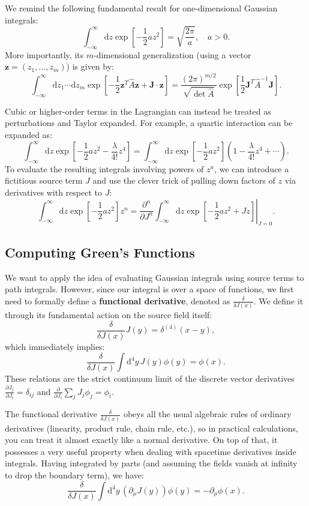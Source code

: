 We remind the following fundamental result for one-dimensional Gaussian integrals:
\[
    \int_{-\infty}^{\infty} \mathrm{d} z \exp\left[-\frac{1}{2} a z^2\right] = \sqrt{\frac{2\pi}{a}}, \quad a > 0.
\]
More importantly, its $m$-dimensional generalization (using a vector $\mathbf{z} = (z_1, \ldots, z_m)$) is given by:
\[
    \int_{-\infty}^{\infty} \mathrm{d} z_1 \cdots \mathrm{d} z_m \exp\left[-\frac{1}{2} \mathbf{z}^T \hat{A} \mathbf{z} + \mathbf{J} \cdot \mathbf{z}\right] = \frac{(2\pi)^{m/2}}{\sqrt{\det \hat{A}}} \exp\left[\frac{1}{2} \mathbf{J}^T \hat{A}^{-1} \mathbf{J}\right].
\]

Cubic or higher-order terms in the Lagrangian can instead be treated as perturbations and Taylor expanded. For example, a quartic interaction can be expanded as:
\[
    \int_{-\infty}^{\infty} \mathrm{d}z \exp\left[-\frac{1}{2} a z^2 - \frac{\lambda}{4!} z^4\right] = \int_{-\infty}^{\infty} \mathrm{d}z \exp\left[-\frac{1}{2} a z^2\right] \left( 1 - \frac{\lambda}{4!} z^4 + \cdots \right).
\]
To evaluate the resulting integrals involving powers of $z^n$, we can introduce a fictitious source term $J$ and use the clever trick of pulling down factors of $z$ via derivatives with respect to $J$:
\[
    \int_{-\infty}^{\infty} \mathrm{d}z \exp\left[-\frac{1}{2} a z^2\right] z^n = \left. \frac{\partial^n}{\partial J^n} \int_{-\infty}^{\infty} \mathrm{d}z \exp\left[-\frac{1}{2} a z^2 + J z\right] \right|_{J=0}.
\]

\subsection{Computing Green's Functions}

We want to apply the idea of evaluating Gaussian integrals using source terms to path integrals. However, since our integral is over a space of functions, we first need to formally define a \textbf{functional derivative}, denoted as $\frac{\delta}{\delta J(x)}$. We define it through its fundamental action on the source field itself:
\[
    \frac{\delta}{\delta J(x)} J(y) = \delta^{(4)}(x-y),
\]
which immediately implies:
\[
    \frac{\delta}{\delta J(x)} \int \mathrm{d}^4 y \, J(y) \phi(y) = \phi(x).
\]
These relations are the strict continuum limit of the discrete vector derivatives $\frac{\partial J_j}{\partial J_i} = \delta_{ij}$ and $\frac{\partial}{\partial J_i} \sum_j J_j \phi_j = \phi_i$.

The functional derivative $\frac{\delta}{\delta J(x)}$ obeys all the usual algebraic rules of ordinary derivatives (linearity, product rule, chain rule, etc.), so in practical calculations, you can treat it almost exactly like a normal derivative. On top of that, it possesses a very useful property when dealing with spacetime derivatives inside integrals. Having integrated by parts (and assuming the fields vanish at infinity to drop the boundary term), we have:
\[
    \frac{\delta}{\delta J(x)} \int \mathrm{d}^4 y \, (\partial_\mu J(y)) \phi(y) = - \partial_\mu \phi(x).
\]

